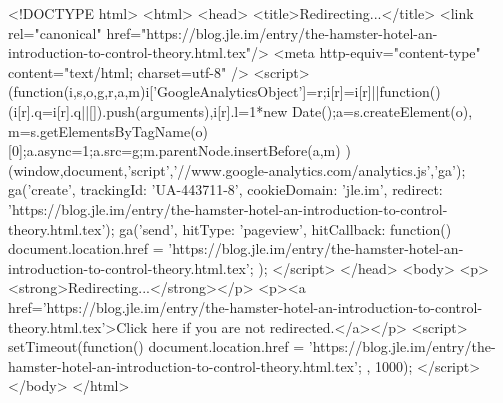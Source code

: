 <!DOCTYPE html>
<html>
<head>
<title>Redirecting...</title>
<link rel="canonical" href="https://blog.jle.im/entry/the-hamster-hotel-an-introduction-to-control-theory.html.tex"/>
<meta http-equiv="content-type" content="text/html; charset=utf-8" />
<script>
(function(i,s,o,g,r,a,m){i['GoogleAnalyticsObject']=r;i[r]=i[r]||function(){
(i[r].q=i[r].q||[]).push(arguments)},i[r].l=1*new Date();a=s.createElement(o),
m=s.getElementsByTagName(o)[0];a.async=1;a.src=g;m.parentNode.insertBefore(a,m)
})(window,document,'script','//www.google-analytics.com/analytics.js','ga');
ga('create', { trackingId: 'UA-443711-8', cookieDomain: 'jle.im', redirect: 'https://blog.jle.im/entry/the-hamster-hotel-an-introduction-to-control-theory.html.tex'});
ga('send', { hitType: 'pageview', hitCallback: function() { document.location.href = 'https://blog.jle.im/entry/the-hamster-hotel-an-introduction-to-control-theory.html.tex'; } });
</script>
</head>
<body>
  <p><strong>Redirecting...</strong></p>
  <p><a href='https://blog.jle.im/entry/the-hamster-hotel-an-introduction-to-control-theory.html.tex'>Click here if you are not redirected.</a></p>
  <script>
    setTimeout(function() { document.location.href = 'https://blog.jle.im/entry/the-hamster-hotel-an-introduction-to-control-theory.html.tex'; }, 1000);
  </script>
</body>
</html>
